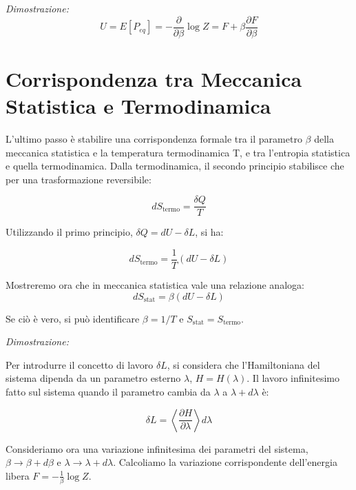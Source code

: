 \textit{Dimostrazione:}
\begin{equation}
U = E[P_{eq}] = -\frac{\partial}{\partial \beta} \log Z = F + \beta \frac{\partial F}{\partial \beta}
\end{equation}




\newpage
\section{Corrispondenza tra Meccanica Statistica e Termodinamica}

L'ultimo passo è stabilire una corrispondenza formale tra il parametro $\beta$ della meccanica statistica e la temperatura termodinamica T, e tra l'entropia statistica e quella termodinamica.
Dalla termodinamica, il secondo principio stabilisce che per una trasformazione reversibile:

\begin{equation}
dS_{\text{termo}} = \frac{\delta Q}{T}
\end{equation}

Utilizzando il primo principio, $\delta Q = dU - \delta L$, si ha:

\begin{equation}
dS_{\text{termo}} = \frac{1}{T}(dU - \delta L)
\end{equation}

Mostreremo ora che in meccanica statistica vale una relazione analoga:
\begin{equation}
dS_{\text{stat}} = \beta(dU - \delta L)
\end{equation}

Se ciò è vero, si può identificare $\beta = 1/T$ e $S_{\text{stat}} = S_{\text{termo}}$.

\vspace{0.5 cm}
\textit{Dimostrazione:}

Per introdurre il concetto di lavoro $\delta L$, si considera che l'Hamiltoniana del sistema dipenda da un parametro esterno $\lambda$, $H = H(\lambda)$. Il lavoro infinitesimo fatto sul sistema quando il parametro cambia da $\lambda$ a $\lambda + d\lambda$ è:

\begin{equation}
\delta L = \left\langle \frac{\partial H}{\partial \lambda} \right\rangle d\lambda
\end{equation}

Consideriamo ora una variazione infinitesima dei parametri del sistema, $\beta \to \beta + d\beta$ e $\lambda \to \lambda + d\lambda$. Calcoliamo la variazione corrispondente dell'energia libera $F = - \frac{1}{\beta} \log Z$.


